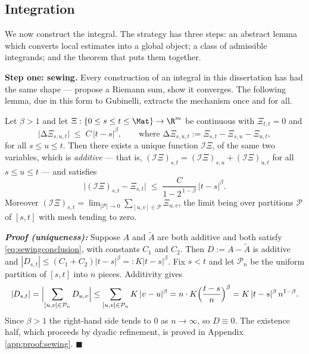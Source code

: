 \subsection{Integration}\label{subsec:roughintegration}

We now construct the integral. The strategy has three steps: an abstract lemma which converts local
estimates into a global object; a class of admissible integrands; and the theorem that puts them
together.

\medskip

\noindent\textbf{Step one: sewing.} Every construction of an integral in this dissertation has had
the same shape --- propose a Riemann sum, show it converges. The following lemma, due in this form
to Gubinelli, extracts the mechanism once and for all.

\begin{lemma}\label{lem:sewing}
Let $\beta > 1$ and let $\Xi : \{0 \leq s \leq t \leq \Mat\} \to \R^m$ be continuous with
$\Xi_{t,t}=0$ and
\begin{equation}\label{eq:sewinghypothesis}
\bigl| \increment{\Xi}_{s,u,t} \bigr| \;\leq\; C\,|t-s|^{\beta}, \qquad \text{where }
\increment{\Xi}_{s,u,t} := \Xi_{s,t} - \Xi_{s,u} - \Xi_{u,t},
\end{equation}
for all $s\leq u\leq t$. Then there exists a unique function $\mathcal{I}\Xi$, of the same two
variables, which is \emph{additive} --- that is, $(\mathcal{I}\Xi)_{s,t} = (\mathcal{I}\Xi)_{s,u} +
(\mathcal{I}\Xi)_{u,t}$ for all $s\leq u\leq t$ --- and satisfies
\begin{equation}\label{eq:sewingconclusion}
\bigl| (\mathcal{I}\Xi)_{s,t} - \Xi_{s,t} \bigr| \;\leq\; \frac{C}{1 - 2^{\,1-\beta}}\,|t-s|^{\beta}.
\end{equation}
Moreover $(\mathcal{I}\Xi)_{s,t} = \lim_{|\mathcal{P}|\to0}\sum_{[u,v]\in\mathcal{P}} \Xi_{u,v}$,
the limit being over partitions $\mathcal{P}$ of $[s,t]$ with mesh tending to zero.
\end{lemma}

\textbf{\textit{Proof (uniqueness):}} Suppose $A$ and $\widetilde A$ are both additive and both
satisfy \eqref{eq:sewingconclusion}, with constants $C_1$ and $C_2$. Then $D := A - \widetilde A$ is
additive and $|D_{s,t}| \leq (C_1+C_2)|t-s|^\beta =: K|t-s|^\beta$. Fix $s<t$ and let
$\mathcal{P}_n$ be the uniform partition of $[s,t]$ into $n$ pieces. Additivity gives
\[
|D_{s,t}| = \Bigl|\sum_{[u,v]\in\mathcal{P}_n} D_{u,v}\Bigr| \leq \sum_{[u,v]\in\mathcal{P}_n} K\,|v-u|^\beta
= n \cdot K \Bigl(\frac{t-s}{n}\Bigr)^{\beta} = K\,|t-s|^{\beta}\,n^{1-\beta}.
\]
Since $\beta>1$ the right-hand side tends to $0$ as $n\to\infty$, so $D \equiv 0$. The existence
half, which proceeds by dyadic refinement, is proved in Appendix \ref{app:proof:sewing}.
\hfill $\blacksquare$

